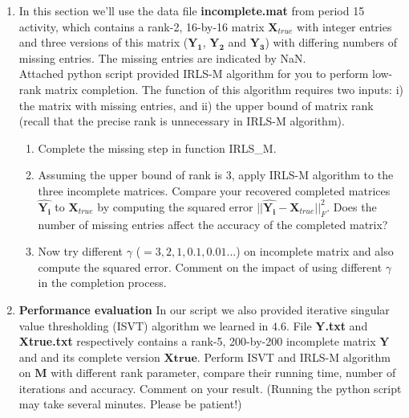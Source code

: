 \documentclass[12pt]{article}
\def \bX{\boldsymbol{X}}
\begin{document}
\begin{enumerate}
    \item In this section we'll use the data file \textbf{incomplete.mat} from period 15 activity, which contains a rank-2, 16-by-16 matrix $\bX_{true}$ with integer entries and three versions of this matrix ($\boldsymbol{Y_1}$, $\boldsymbol{Y_2}$ and $\boldsymbol{Y_3}$) with differing numbers of missing entries. The missing entries are indicated by NaN.\\
    Attached python script provided IRLS-M algorithm for you to perform low-rank matrix completion. The function of this algorithm requires two inputs: i) the matrix with missing entries, and ii) the upper bound of matrix rank (recall that the precise rank is unnecessary in IRLS-M algorithm).
    \begin{enumerate}
    \item Complete the missing step in function IRLS\_M. 
    \item Assuming the upper bound of rank is 3, apply IRLS-M algorithm to the three incomplete matrices. Compare your recovered completed matrices $\boldsymbol{\hat{Y_i}}$ to $\bX_{true}$ by computing the squared error $||\boldsymbol{\hat{Y_i}} - \bX_{true}||^2_F$. Does the number of missing entries affect the accuracy of the completed matrix?
    \item Now try different $\gamma$ ($ = 3, 2, 1, 0.1, 0.01 ...$) on incomplete matrix and also compute the squared error. Comment on the impact of using different $\gamma$ in the completion process.
    \end{enumerate}
    
    \item \textbf{Performance evaluation} In our script we also provided iterative singular value thresholding (ISVT) algorithm we learned in $4.6$. File \textbf{Y.txt} and \textbf{Xtrue.txt} respectively contains a rank-5, 200-by-200 incomplete matrix $\boldsymbol{Y}$ and and its complete version $\boldsymbol{Xtrue}$. Perform ISVT and IRLS-M algorithm on $\boldsymbol{M}$ with different rank parameter, compare their running time, number of iterations and accuracy. Comment on your result. (Running the python script may take several minutes. Please be patient!)\\
\end{enumerate}
\newpage
\end{document}
